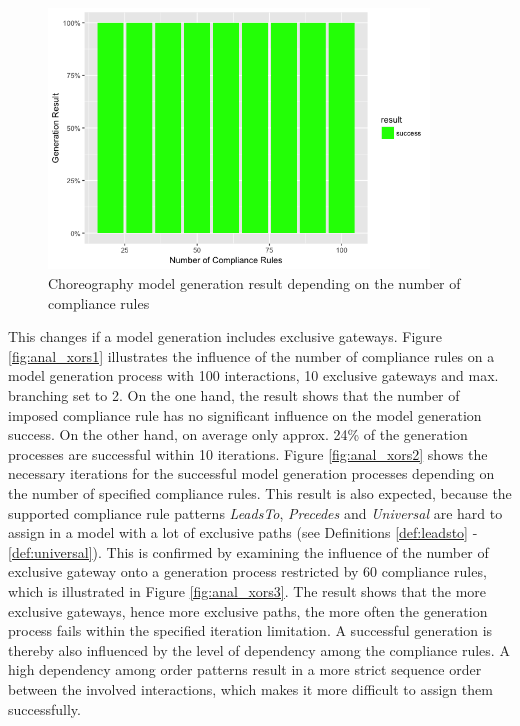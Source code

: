 \begin{figure}[htb]
\centering
\includegraphics[width=0.9\textwidth]{src/images/ands_build_result.png}
\caption{Choreography model generation result depending on the number of compliance rules}
\label{fig:anal_ands1}
\end{figure}


This changes if a model generation includes exclusive gateways. Figure \ref{fig:anal_xors1} illustrates the influence of the number of compliance rules on a model generation process with 100 interactions, 10 exclusive gateways and max. branching set to 2. On the one hand, the result shows that the number of imposed compliance rule has no significant influence on the model generation success. On the other hand, on average only approx. 24\% of the generation processes are successful within 10 iterations. Figure \ref{fig:anal_xors2} shows the necessary iterations for the successful model generation processes depending on the number of specified compliance rules. This result is also expected, because the supported compliance rule patterns \textit{LeadsTo}, \textit{Precedes} and \textit{Universal} are hard to assign in a model with a lot of exclusive paths (see Definitions \ref{def:leadsto} - \ref{def:universal}). This is confirmed by examining the influence of the number of exclusive gateway onto a generation process restricted by 60 compliance rules, which is illustrated in Figure \ref{fig:anal_xors3}. The result shows that the more exclusive gateways, hence more exclusive paths, the more often the generation process fails within the specified iteration limitation. A successful generation is thereby also influenced by the level of dependency among the compliance rules. A high dependency among order patterns result in a more strict sequence order between the involved interactions, which makes it more difficult to assign them successfully.

